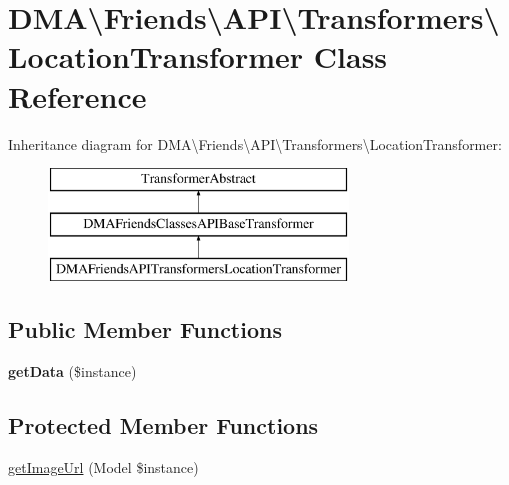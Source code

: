 \hypertarget{classDMA_1_1Friends_1_1API_1_1Transformers_1_1LocationTransformer}{}\section{D\+M\+A\textbackslash{}Friends\textbackslash{}A\+P\+I\textbackslash{}Transformers\textbackslash{}Location\+Transformer Class Reference}
\label{classDMA_1_1Friends_1_1API_1_1Transformers_1_1LocationTransformer}
Inheritance diagram for D\+M\+A\textbackslash{}Friends\textbackslash{}A\+P\+I\textbackslash{}Transformers\textbackslash{}Location\+Transformer\+:\begin{figure}[H]
\begin{center}
\leavevmode
\includegraphics[height=3.000000cm]{d9/d36/classDMA_1_1Friends_1_1API_1_1Transformers_1_1LocationTransformer}
\end{center}
\end{figure}
\subsection*{Public Member Functions}
\begin{DoxyCompactItemize}
\item 
\hypertarget{classDMA_1_1Friends_1_1API_1_1Transformers_1_1LocationTransformer_a1c6afa02557796e620042cd23acc4ab5}{}{\bfseries get\+Data} (\$instance)\label{classDMA_1_1Friends_1_1API_1_1Transformers_1_1LocationTransformer_a1c6afa02557796e620042cd23acc4ab5}

\end{DoxyCompactItemize}
\subsection*{Protected Member Functions}
\begin{DoxyCompactItemize}
\item 
\hyperlink{classDMA_1_1Friends_1_1API_1_1Transformers_1_1LocationTransformer_a455fe5c1c50b13141cc07410b2e80992}{get\+Image\+Url} (Model \$instance)
\end{DoxyCompactItemize}
